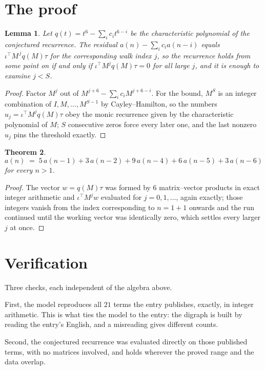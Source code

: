 \documentclass[11pt,a4paper]{article}
\theoremstyle{plain}
\newtheorem{theorem}{Theorem}
\newtheorem{lemma}[theorem]{Lemma}
\theoremstyle{definition}
\begin{document}
\section{The proof}

\begin{lemma}\label{lem:crit}
Let $q(t)=t^{6}-\sum_i c_it^{6-i}$ be the characteristic polynomial of the
conjectured recurrence. The residual $a(n)-\sum_ic_ia(n-i)$ equals
$\iota^{\!\top}M^{\,j}q(M)\tau$ for the corresponding walk index $j$, so the recurrence
holds from some point on if and only if $\iota^{\!\top}M^{j}q(M)\tau=0$ for all large $j$,
and it is enough to examine $j<S$.
\end{lemma}

\begin{proof}
Factor $M^{j}$ out of $M^{j+6}-\sum_ic_iM^{j+6-i}$. For the bound, $M^{S}$
is an integer combination of $I,M,\dots,M^{S-1}$ by Cayley--Hamilton, so the numbers
$u_j=\iota^{\!\top}M^{j}q(M)\tau$ obey the monic recurrence given by the characteristic
polynomial of $M$; $S$ consecutive zeros force every later one, and the last nonzero $u_j$
pins the threshold exactly.
\end{proof}

\begin{theorem}
\[
a(n)\;=\;5\,a(n-1) + 3\,a(n-2) + 9\,a(n-4) + 6\,a(n-5) + 3\,a(n-6)
\]
for every $n>1$.
\end{theorem}

\begin{proof}
The vector $w=q(M)\tau$ was formed by $6$ matrix--vector products in exact integer
arithmetic and $\iota^{\!\top}M^{j}w$ evaluated for $j=0,1,\dots$, again exactly; those
integers vanish from the index corresponding to $n=1+1$ onwards and the run continued
until the working vector was identically zero, which settles every larger $j$ at once.
\end{proof}

\section{Verification}

Three checks, each independent of the algebra above.

First, the model reproduces all $21$ terms the entry publishes, exactly, in integer
arithmetic. This is what ties the model to the entry: the digraph is built by reading the
entry's English, and a misreading gives different counts.

Second, the conjectured recurrence was evaluated directly on those published terms, with no
matrices involved, and holds wherever the proved range and the data overlap.
\end{document}
